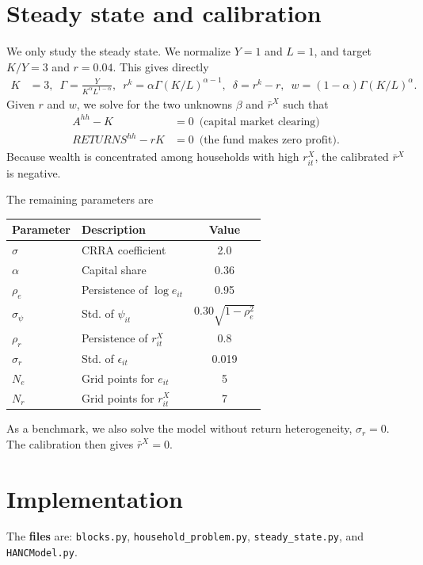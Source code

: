 \documentclass[12pt,english]{article}
\begin{document}
\newpage{}

\section*{Steady state and calibration}

We only study the steady state. We normalize $Y=1$ and $L=1$, and
target $K/Y=3$ and $r=0.04$. This gives directly
\begin{align*}
K & =3,\,\,\,\Gamma=\frac{Y}{K^{\alpha}L^{1-\alpha}},\,\,\,r^{k}=\alpha\Gamma(K/L)^{\alpha-1},\,\,\,\delta=r^{k}-r,\,\,\,w=(1-\alpha)\Gamma(K/L)^{\alpha}.
\end{align*}
Given $r$ and $w$, we solve for the two unknowns $\beta$ and $\bar{r}^{X}$
such that
\begin{align*}
A^{hh}-K & =0\,\,\,\text{(capital market clearing)}\\
RETURNS^{hh}-rK & =0\,\,\,\text{(the fund makes zero profit)}.
\end{align*}
Because wealth is concentrated among households with high
$r^{X}_{it}$, the calibrated $\bar{r}^{X}$ is negative.

The remaining parameters are
\begin{center}
\begin{tabular}{llc}
\toprule
Parameter & Description & Value\tabularnewline
\midrule
$\sigma$ & CRRA coefficient & 2.0\tabularnewline
$\alpha$ & Capital share & 0.36\tabularnewline
$\rho_{e}$ & Persistence of $\log e_{it}$ & 0.95\tabularnewline
$\sigma_{\psi}$ & Std. of $\psi_{it}$ & $0.30\sqrt{1-\rho^{2}_{e}}$\tabularnewline
$\rho_{r}$ & Persistence of $r^{X}_{it}$ & 0.8\tabularnewline
$\sigma_{r}$ & Std. of $\epsilon_{it}$ & 0.019\tabularnewline
$N_{e}$ & Grid points for $e_{it}$ & 5\tabularnewline
$N_{r}$ & Grid points for $r^{X}_{it}$ & 7\tabularnewline
\bottomrule
\end{tabular}
\par\end{center}

As a benchmark, we also solve the model without return heterogeneity,
$\sigma_{r}=0$. The calibration then gives $\bar{r}^{X}=0$.

\section*{\newpage Implementation}

The \textbf{files} are: \lstinline{blocks.py}, \lstinline{household_problem.py},
\lstinline{steady_state.py}, and \lstinline{HANCModel.py}.
\end{document}
